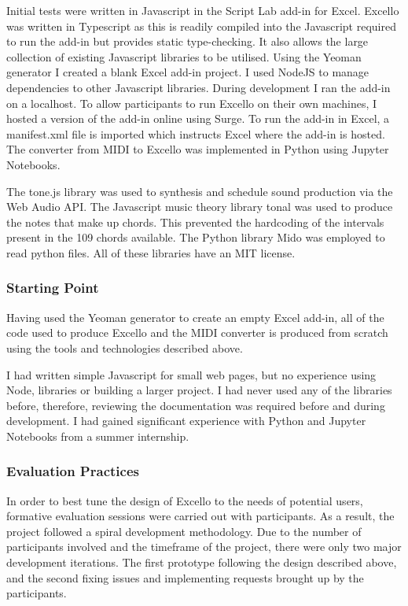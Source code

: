 \documentclass{article}
\begin{document}
Initial tests were written in Javascript in the Script Lab add-in for Excel. Excello was written in Typescript as this is readily compiled into the Javascript required to run the add-in but provides static type-checking. It also allows the large collection of existing Javascript libraries to be utilised. Using the Yeoman generator I created a blank Excel add-in project. I used NodeJS to manage dependencies to other Javascript libraries. During development I ran the add-in on a localhost. To allow participants to run Excello on their own machines, I hosted a version of the add-in online using Surge. To run the add-in in Excel, a manifest.xml file is imported which instructs Excel where the add-in is hosted. The converter from MIDI to Excello was implemented in Python using Jupyter Notebooks.

The tone.js library was used to synthesis and schedule sound production via the Web Audio API. The Javascript music theory library tonal was used to produce the notes that make up chords. This prevented the hardcoding of the intervals present in the 109 chords available. The Python library Mido was employed to read python files. All of these libraries have an MIT license.

\subsubsection{Starting Point}

Having used the Yeoman generator to create an empty Excel add-in, all of the code used to produce Excello and the MIDI converter is produced from scratch using the tools and technologies described above.

I had written simple Javascript for small web pages, but no experience using Node, libraries or building a larger project. I had never used any of the libraries before, therefore, reviewing the documentation was required before and during development. I had gained significant experience with Python and Jupyter Notebooks from a summer internship.

\subsubsection{Evaluation Practices}

In order to best tune the design of Excello to the needs of potential users, formative evaluation sessions were carried out with participants. As a result, the project followed a spiral development methodology. Due to the number of participants involved and the timeframe of the project, there were only two major development iterations. The first prototype following the design described above, and the second fixing issues and implementing requests brought up by the participants.
\end{document}
